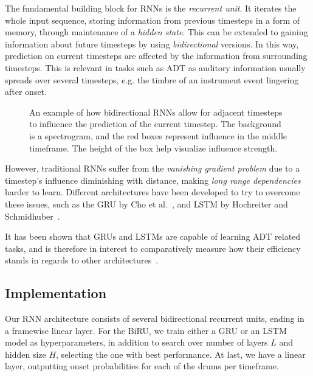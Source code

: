 The fundamental building block for \glspl{RNN} is the \textit{recurrent unit}. It iterates the whole input sequence, storing information from previous timesteps in a form of memory, through maintenance of a \textit{hidden state}. This can be extended to gaining information about future timesteps by using \textit{bidirectional} versions. In this way, prediction on current timesteps are affected by the information from surrounding timesteps. This is relevant in tasks such as \gls{ADT} as auditory information usually spreads over several timesteps, e.g. the timbre of an instrument event lingering after onset.

\begin{figure}[H]
    \centering
    
    \caption{An example of how bidirectional \glspl{RNN} allow for adjacent timesteps to influence the prediction of the current timestep. The background is a spectrogram, and the red boxes represent influence in the middle timeframe. The height of the box help visualize influence strength.}
    \label{RNNInfluenceFigure}
\end{figure}

However, traditional \glspl{RNN} suffer from the \textit{vanishing gradient problem} due to a timestep's influence diminishing with distance, making \textit{long range dependencies} harder to learn. Different architectures have been developed to try to overcome these issues, such as the \gls{GRU} by Cho et al.~\cite{DBLP:conf/emnlp/ChoMGBBSB14}, and \gls{LSTM} by Hochreiter and Schmidhuber~\cite{10.1162/neco.1997.9.8.1735}.

It has been shown that \glspl{GRU} and \glspl{LSTM} are capable of learning \gls{ADT} related tasks, and is therefore in interest to comparatively measure how their efficiency stands in regards to other architectures~\cite{Southall2016AutomaticDT, vogl2016recurrent, Vogl2017DrumTV, signals4040042}.

\subsection{Implementation}

Our \gls{RNN} architecture consists of several bidirectional recurrent units, ending in a framewise linear layer. For the \gls{BiRU}, we train either a \gls{GRU} or an \gls{LSTM} model as hyperparameters, in addition to search over number of layers $L$ and hidden size $H$, selecting the one with best performance. At last, we have a linear layer, outputting onset probabilities for each of the drums per timeframe.

